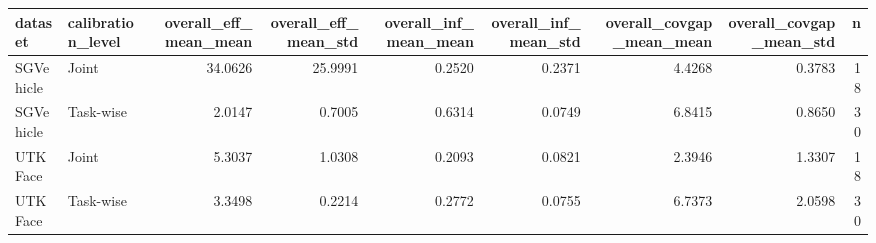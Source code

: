 \begin{tabular}{llrrrrrrr}
\toprule
dataset & calibration_level & overall_eff_mean_mean & overall_eff_mean_std & overall_inf_mean_mean & overall_inf_mean_std & overall_covgap_mean_mean & overall_covgap_mean_std & n \\
\midrule
SGVehicle & Joint & 34.0626 & 25.9991 & 0.2520 & 0.2371 & 4.4268 & 0.3783 & 18 \\
SGVehicle & Task-wise & 2.0147 & 0.7005 & 0.6314 & 0.0749 & 6.8415 & 0.8650 & 30 \\
UTKFace & Joint & 5.3037 & 1.0308 & 0.2093 & 0.0821 & 2.3946 & 1.3307 & 18 \\
UTKFace & Task-wise & 3.3498 & 0.2214 & 0.2772 & 0.0755 & 6.7373 & 2.0598 & 30 \\
\bottomrule
\end{tabular}
